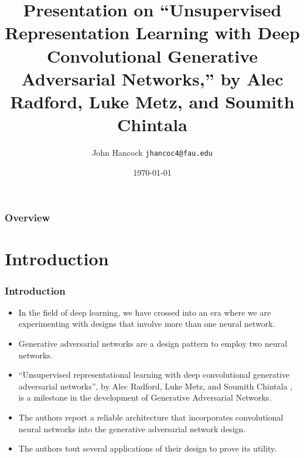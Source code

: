 \documentclass{beamer}
\title[Unsupervised Representation Learning with Deep Convolutional
Generative Adversarial Networks]{Presentation on ``Unsupervised Representation 
Learning with Deep Convolutional Generative Adversarial Networks,'' by Alec Radford, Luke Metz, and Soumith Chintala} %
\author[Joh Hancock]{John Hancock \texttt{jhancoc4@fau.edu}}
\date{\today} %
\begin{document}
\begin{frame}
\titlepage %
\end{frame}

\begin{frame}
\frametitle{Overview} %
\tableofcontents %
\end{frame}

\section{Introduction}
\begin{frame}
\frametitle{Introduction}
\begin{itemize}
    \item In the field of deep learning, we have crossed into an era where we
are experimenting with designs that involve more than one neural network.  
    
    \item Generative adversarial networks are a design pattern to employ two
neural networks.  
    
    \item ``Unsupervised representational learning with deep convolutional
generative adversarial networks'', by Alec Radford,  Luke Metz, and Soumith Chintala
\cite{repLearnDcgan}, is a milestone in the development of Generative Adversarial 
Networks. 
    \item The authors report a reliable architecture that incorporates convolutional 
neural networks into the generative adversarial network design.  
    
    \item The authors tout several applications of their design to prove its
utility.
 \end{itemize}
\end{frame}
\end{document}
